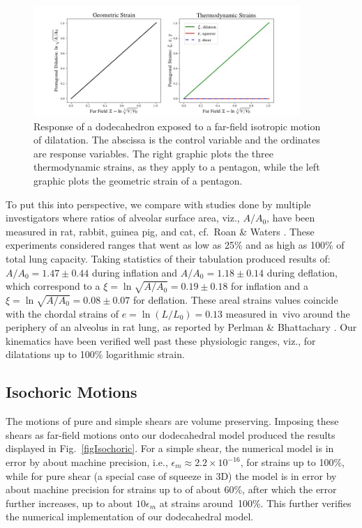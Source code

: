 \begin{figure}
	\centering
	\includegraphics[width=0.9\textwidth]{figures/dilatationGeoVsThermo.jpg}
	\caption{Response of a dodecahedron exposed to a far-field isotropic motion of dilatation.  The abscissa is the control variable and the ordinates are response variables. The right graphic plots the three thermo\-dynamic strains, as they apply to a pentagon, while the left graphic plots the geometric strain of a pentagon.}
	\label{figDilatation2}
\end{figure}

To put this into perspective, we compare with studies done by multiple investigators where ratios of alveolar surface area, viz., $A/A_0$, have been measured in rat, rabbit, guinea pig, and cat, cf.\ Roan \& Waters \cite[Table~1]{RoanWaters11}.  These experiments considered ranges that went as low as 25\% and as high as 100\% of total lung capacity.  Taking statistics of their tabulation produced results of: $A/A_0 = 1.47 \pm 0.44$ during inflation and $A/A_0 = 1.18 \pm 0.14$ during deflation, which correspond to a $\xi = \ln\sqrt{A/A_0} = 0.19 \pm 0.18$ for inflation and a $\xi = \ln\sqrt{A/A_0} = 0.08 \pm 0.07$ for deflation.  These areal strains values coincide with the chordal strains of $e=\ln(L/L_0) = 0.13$ measured in~vivo around the periphery of an alveolus in rat lung, as reported by Perlman \& Bhattachary \cite{PerlmanBhattacharya07}.  Our kinematics have been verified well past these physiologic ranges, viz., for dilatations up to 100\% logarithmic strain. 

\subsection{Isochoric Motions}

The motions of pure and simple shears are volume preserving.  Imposing these shears as far-field motions onto our dodecahedral model produced the results displayed in Fig.~\ref{figIsochoric}.  For a simple shear, the numerical model is in error by about machine precision, i.e., $\epsilon_m \approx 2.2 \times 10^{-16}$, for strains up to 100\%, while for pure shear (a special case of squeeze in 3D) the model is in error by about machine precision for strains up to of about 60\%, after which the error further increases, up to about $10\epsilon_m$ at strains around~100\%.  This further verifies the numerical implementation of our dodecahedral model.

